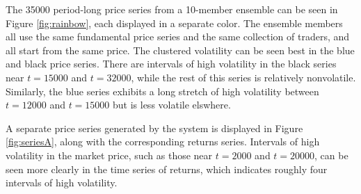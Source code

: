 \documentclass{article}
\begin{document}
The 35000 period-long price series from a 10-member ensemble can be seen in Figure \ref{fig:rainbow}, each displayed in a separate color. The ensemble members all use the same fundamental price series and the same collection of traders, and all start from the same price.
The clustered volatility can be seen best in the blue and black price series. There are intervals of high volatility in the black series near $t=15000$ and $t=32000$, while the rest of this series is relatively nonvolatile. Similarly, the blue series exhibits a long stretch of high volatility between $t=12000$ and $t=15000$ but is less volatile elswhere.

A separate price series generated by the system is displayed in Figure \ref{fig:seriesA}, along with the corresponding returns series. Intervals of high volatility in the market price, such as those near $t=2000$ and $t=20000$, can be seen more clearly in the time series of returns, which indicates roughly four intervals of high volatility.
\end{document}
